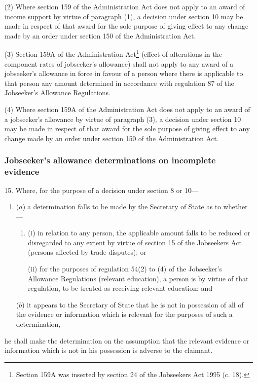 \documentclass[12pt,a4paper]{article}
\begin{document}
(2) Where section 159 of the Administration Act does not apply to an award of income support by virtue of paragraph (1), a decision under section 10 may be made in respect of that award for the sole purpose of giving effect to any change made by an order under section 150 of the Administration Act.

(3) Section 159A of the Administration Act\footnote{\frenchspacing Section 159A was inserted by section 24 of the Jobseekers Act 1995 (c. 18).} (effect of alterations in the component rates of jobseeker’s allowance) shall not apply to any award of a jobseeker’s allowance in force in favour of a person where there is applicable to that person any amount determined in accordance with regulation 87 of the Jobseeker’s Allowance Regulations.

(4) Where section 159A of the Administration Act does not apply to an award of a jobseeker’s allowance by virtue of paragraph (3), a decision under section 10 may be made in respect of that award for the sole purpose of giving effect to any change made by an order under section 150 of the Administration Act.

\subsubsection[15. Jobseeker’s allowance determinations on incomplete evidence]{Jobseeker’s allowance determinations on incomplete evidence}

15.  Where, for the purpose of a decision under section 8 or 10—
\begin{enumerate}\item[]
($a$) a determination falls to be made by the Secretary of State as to whether—
\begin{enumerate}\item[]
(i) in relation to any person, the applicable amount falls to be reduced or disregarded to any extent by virtue of section 15 of the Jobseekers Act (persons affected by trade disputes); or

(ii) for the purposes of regulation 54(2) to (4) of the Jobseeker’s Allowance Regulations (relevant education), a person is by virtue of that regulation, to be treated as receiving relevant education; and
\end{enumerate}

($b$) it appears to the Secretary of State that he is not in possession of all of the evidence or information which is relevant for the purposes of such a determination,
\end{enumerate}
he shall make the determination on the assumption that the relevant evidence or information which is not in his possession is adverse to the claimant.
\end{document}

